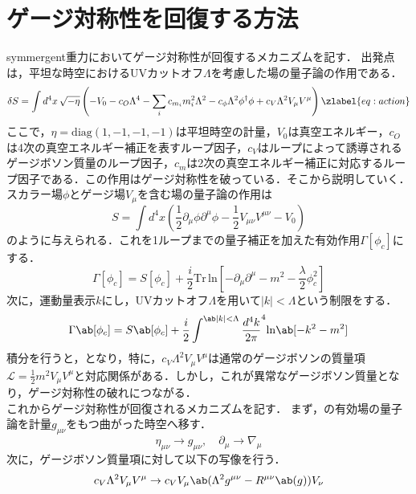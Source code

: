 \section{ゲージ対称性を回復する方法}
symmergent重力においてゲージ対称性が回復するメカニズムを記す．
出発点は，平坦な時空におけるUVカットオフ$\Lambda$を考慮した場の量子論の作用である．
\begin{dmath}
    \delta S= \int d^4x\,\sqrt{-\eta}\left(-V_0-c_O \Lambda^4-\sum_i c_{m_i} m_i^2 \Lambda^2-c_\phi \Lambda^2 \phi^\dagger \phi+c_V \Lambda^2 V_\mu V^\mu\right)
    \zlabel{eq:action}
\end{dmath}
ここで，$\eta = \mathrm{diag}(1,-1,-1,-1)$は平坦時空の計量，$V_0$は真空エネルギー，$c_O$は4次の真空エネルギー補正を表すループ因子，$c_V$はループによって誘導されるゲージボソン質量のループ因子，$c_m$は2次の真空エネルギー補正に対応するループ因子である．この作用はゲージ対称性を破っている．そこから説明していく．\\
スカラー場$\phi$とゲージ場$V_\mu$を含む場の量子論の作用は
\begin{dmath}
    S= \int d^4x\left(\frac{1}{2}\partial_\mu \phi \partial^\mu \phi -\frac{1}{2} V_{\mu\nu} V^{\mu\nu} -V_0\right)
\end{dmath}
のように与えられる．これを1ループまでの量子補正を加えた有効作用$\Gamma\left[\phi_c \right]$にする．
\begin{dmath}
    \Gamma \left[\phi_c \right]=S \left[\phi_c \right]+\frac{i}{2} \mathrm{Tr}\, \mathrm{ln} \left[-\partial_\mu \partial^\mu -m^2 -\frac{\lambda}{2}\phi^2_c \right]
\end{dmath}
次に，運動量表示$k$にし，UVカットオフ$\Lambda$を用いて$\left|k\right|<\Lambda$という制限をする．
\begin{dmath}
    \Gamma \ab[\phi_c]=S \ab[\phi_c]+\frac{i}{2} \int ^{\ab|k|<\Lambda} \frac{d^4k}{2\pi}^4 \mathrm{ln} \ab[-k^2 -m^2]
\end{dmath}
積分を行うと，となり，特に，$c_V \Lambda^2 V_\mu V^\mu$は通常のゲージボソンの質量項$\mathcal{L}=\frac{1}{2}m^2 V_\mu V^\mu$と対応関係がある．しかし，これが異常なゲージボソン質量となり，ゲージ対称性の破れにつながる．\\
これからゲージ対称性が回復されるメカニズムを記す．
まず，の有効場の量子論を計量$g_{\mu\nu}$をもつ曲がった時空へ移す．
 \[\eta_{\mu\nu} \rightarrow g_{\mu\nu},\quad \partial_\mu \rightarrow \nabla_\mu\]
 次に，ゲージボソン質量項に対して以下の写像を行う．
 \begin{dmath}
    c_V \Lambda^2 V_\mu V^\mu \to c_V V_\mu \ab(\Lambda^2 g^{\mu\nu}-R^{\mu\nu}\ab(g))V_\nu
 \end{dmath}
